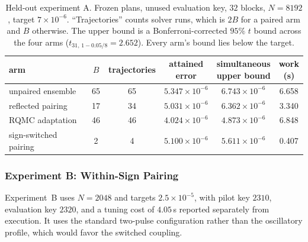 \documentclass[smallextended,nospthms]{svjour3}
\theoremstyle{plain}
\theoremstyle{definition}
\theoremstyle{remark}
\numberwithin{equation}{section}
\begin{document}
\begin{table}[htbp]
\centering
\caption{Held-out experiment A. Frozen plans, unused evaluation key, $32$
blocks, $N=8192$, target $7\times10^{-6}$. ``Trajectories'' counts solver runs,
which is $2B$ for a paired arm and $B$ otherwise. The upper bound is a
Bonferroni-corrected $95\%$ $t$ bound across the four arms
($t_{31,\,1-0.05/8}=2.652$). Every arm's bound lies below the target.}
\label{tab:heldoutA}
\small
\setlength{\tabcolsep}{3pt}
\begin{tabular}{lccccc}
\toprule
arm & $B$ & trajectories & \shortstack{attained\\error} & \shortstack{simultaneous\\upper bound} & \shortstack{work\\(s)}\\
\midrule
unpaired ensemble        & 65 & 65 & $5.347\times10^{-6}$ & $6.743\times10^{-6}$ & 6.658\\
reflected pairing        & 17 & 34 & $5.031\times10^{-6}$ & $6.362\times10^{-6}$ & 3.340\\
RQMC adaptation          & 46 & 46 & $4.024\times10^{-6}$ & $4.873\times10^{-6}$ & 6.848\\
sign-switched pairing & 2 & 4 & $5.100\times10^{-6}$ & $5.611\times10^{-6}$ & 0.407\\
\bottomrule
\end{tabular}
\end{table}

\subsubsection{Experiment B: Within-Sign Pairing}
\label{sec:heldoutB}

Experiment~B uses $N=2048$ and targets $2.5\times10^{-5}$, with pilot key
$2310$, evaluation key $2320$, and a tuning cost of $4.05$\,s reported
separately from execution. It uses the standard two-pulse configuration rather
than the oscillatory profile, which would favor the switched coupling.
\end{document}
